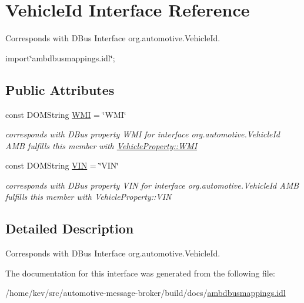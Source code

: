 \hypertarget{interfaceVehicleId}{\section{Vehicle\+Id Interface Reference}
\label{interfaceVehicleId}
}


Corresponds with D\+Bus Interface org.\+automotive.\+Vehicle\+Id.  




{\ttfamily import\char`\"{}ambdbusmappings.\+idl\char`\"{};}

\subsection*{Public Attributes}
\begin{DoxyCompactItemize}
\item 
\hypertarget{interfaceVehicleId_a975a5877bb5ffd2df7e778af11b741c7}{const D\+O\+M\+String \hyperlink{interfaceVehicleId_a975a5877bb5ffd2df7e778af11b741c7}{W\+M\+I} = \char`\"{}W\+M\+I\char`\"{}}\label{interfaceVehicleId_a975a5877bb5ffd2df7e778af11b741c7}

\begin{DoxyCompactList}\small\item\em corresponds with D\+Bus property W\+M\+I for interface org.\+automotive.\+Vehicle\+Id A\+M\+B fulfills this member with \hyperlink{classVehicleProperty_a32f980d900d97cf94171ea9fa25408e0}{Vehicle\+Property\+::\+W\+M\+I} \end{DoxyCompactList}\item 
\hypertarget{interfaceVehicleId_aabe466f31c84fcb81c6462ecdcc7ae3c}{const D\+O\+M\+String \hyperlink{interfaceVehicleId_aabe466f31c84fcb81c6462ecdcc7ae3c}{V\+I\+N} = \char`\"{}V\+I\+N\char`\"{}}\label{interfaceVehicleId_aabe466f31c84fcb81c6462ecdcc7ae3c}

\begin{DoxyCompactList}\small\item\em corresponds with D\+Bus property V\+I\+N for interface org.\+automotive.\+Vehicle\+Id A\+M\+B fulfills this member with Vehicle\+Property\+::\+V\+I\+N \end{DoxyCompactList}\end{DoxyCompactItemize}


\subsection{Detailed Description}
Corresponds with D\+Bus Interface org.\+automotive.\+Vehicle\+Id. 

The documentation for this interface was generated from the following file\+:\begin{DoxyCompactItemize}
\item 
/home/kev/src/automotive-\/message-\/broker/build/docs/\hyperlink{ambdbusmappings_8idl}{ambdbusmappings.\+idl}\end{DoxyCompactItemize}
